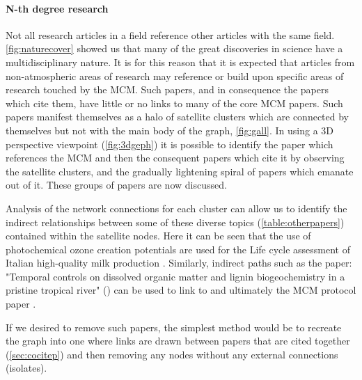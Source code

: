 \paragraph*{N-th degree research}
Not all research articles in a field reference other articles with the same field. \autoref{fig:naturecover} showed us that many of the great discoveries in science have a multidisciplinary nature. It is for this reason that it is expected that articles from non-atmospheric areas of research may reference or build upon specific areas of research touched by the MCM. Such papers, and in consequence the papers which cite them, have little or no links to many of the core MCM papers. Such papers manifest themselves as a halo of satellite clusters which are connected by themselves but not with the main body of the graph, \autoref{fig:gall}. In using a 3D perspective viewpoint (\autoref{fig:3dgeph}) it is possible to identify the paper which references the MCM and then the consequent papers which cite it by observing the satellite clusters, and the gradually lightening spiral of papers which emanate out of it. These groups of papers are now discussed. 

Analysis of the network connections for each cluster can allow us to identify the indirect relationships between some of these diverse topics (\autoref{table:otherpapers}) contained within the satellite nodes. Here it can be seen that the use of photochemical ozone creation potentials \citep{milk1,milk2} are used for the Life cycle assessment of Italian high-quality milk production \citep{milk}. 
Similarly, indirect paths such as the paper:
 "Temporal controls on dissolved organic matter and lignin biogeochemistry in a pristine tropical river" (\citep{biogeo}) can be used to link to \citep{georiver1} and ultimately the MCM protocol paper \citep{mcmpartA}.
 
 If we desired to remove such papers, the simplest method would be to recreate the graph into one where links are drawn between papers that are cited together (\autoref{sec:cocitep})
 and then removing any nodes without any external connections (isolates).

